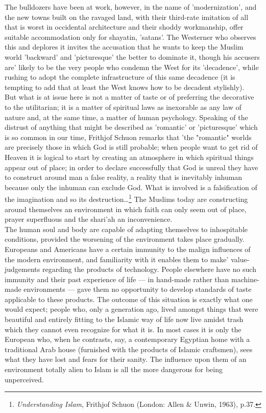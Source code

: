 \documentclass[11pt, b5paper, twoside]{book}
\begin{document}
The bulldozers have been at work, however, in the name of 'modernization', and the new towns built on 
the ravaged land, with their third-rate imitation of all that is worst in occidental architecture and 
their shoddy workmanship, offer suitable accommodation only for shayatin, 'satans'. The Westerner who 
observes this and deplores it invites the accusation that he wants to keep the Muslim world 
'backward' and 'picturesque' the better to dominate it, though his accusers are' likely to be the 
very people who condemn the West for its 'decadence', while rushing to adopt the complete 
infrastructure of this same decadence (it is tempting to add that at least the West knows how to be 
decadent stylishly). \\

But what is at issue here is not a matter of taste or of preferring the decorative to the 
utilitarian; it is a matter of spiritual laws as inexorable as any law of nature and, at the same 
time, a matter of human psychology. Speaking of the distrust of anything that might be described as 
'romantic' or 'picturesque' which is so common in our time, Frithjof Schuon remarks that 'the 
"romantic" worlds are precisely those in which God is still probable; when people want to get rid of 
Heaven it is logical to start by creating an atmosphere in which spiritual things appear out of 
place; in order to declare successfully that God is unreal they have to construct around man a false 
reality, a reality that is inevitably inhuman because only the inhuman can exclude God. What is 
involved is a falsification of the imagination and so its destruction\ldots\footnote{\emph{Understanding Islam}, Frithjof Schuon (London: Allen \& Unwin, 1963), p.37.} The Muslims today are 
constructing around themselves an environment in which faith can only seem out of place, prayer 
superfluous and the shari'ah an inconvenience. \\

The human soul and body are capable of adapting themselves to inhospitable conditions, provided the 
worsening of the environment takes place gradually. Europeans and Americans have a certain immunity 
to the malign influences of the modern environment, and familiarity with it enables them to make' 
value-judgements regarding the products of technology. People elsewhere have no such immunity and 
their past experience of life --- in hand-made rather than machine-made environments --- gave them no 
opportunity to develop standards of taste applicable to these products. The outcome of this situation 
is exactly what one would expect; people who, only a generation ago, lived amongst things that were 
beautiful and entirely fitting to the Islamic way of life now live amidst trash which they cannot 
even recognize for what it is. In most cases it is only the European who, when he contrasts, say, a 
contemporary Egyptian home with a traditional Arab house (furnished with the products of Islamic 
craftsmen), sees what they have lost and fears for their sanity. The influence upon them of an 
environment totally alien to Islam is all the more dangerous for being unperceived. \\
\end{document}
